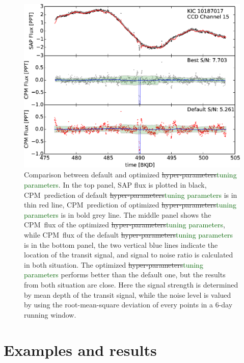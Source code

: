 \documentclass[12pt, preprint]{aastex}
\newcommand{\name}{CPM}
\newcommand{\revise}[1]{\textcolor{darkgreen}{#1}}
\newcommand{\remove}[1]{\sout{#1}}
\begin{document}
\begin{figure}[p]
\begin{center}
\includegraphics[width=\textwidth]{f3}
\end{center}
\caption{
  \label{hyperparameter} 
  Comparison between default and optimized \remove{hyper-parameters}\revise{tuning parameters}. 
  In the top panel, SAP flux is plotted in black, 
    \name\ prediction of default \remove{hyper-parameters}\revise{tuning parameters} is in thin red line, 
    \name\ prediction of optimized \remove{hyper-parameters}\revise{tuning parameters} is in bold grey line. 
  The middle panel shows the \name\ flux of the optimized \remove{hyper-parameters}\revise{tuning parameters}, 
    while \name\ flux of the default \remove{hyper-parameters}\revise{tuning parameters} is in the bottom panel, 
    the two vertical blue lines indicate the location of the transit signal, 
    and signal to noise ratio is calculated in both situation. 
  The optimized \remove{hyper-parameters}\revise{tuning parameters} performs better than the default one, 
    but the results from both situation are close.
  Here the signal strength is determined by mean depth of the transit signal,
    while the noise level is valued by 
    using the root-mean-square deviation of every points in a 6-day running window.}
\end{figure}

\section{Examples and results}
\end{document}
